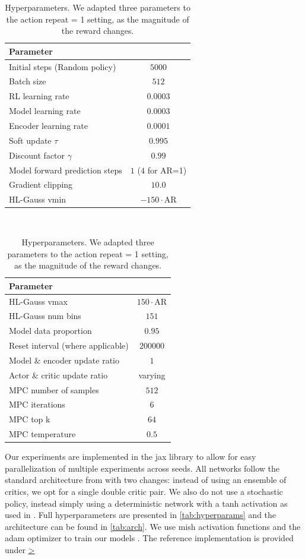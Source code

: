 \begin{table}[t]
    \begin{tabular}{l|c}
        Parameter & \\\hline 
        Initial steps (Random policy) & $5000$  \\
        Batch size & $512$ \\
        RL learning rate & $0.0003$ \\
        Model learning rate & $0.0003$ \\
        Encoder learning rate & $0.0001$ \\
        Soft update $\tau$  & $0.995$ \\
        Discount factor $\gamma$  & $0.99$\\
        Model forward prediction steps & $1$ ($4$ for AR=1) \\
        Gradient clipping &  $10.0$ \\
        HL-Gauss vmin& $-150 \cdot \mathrm{AR}$ \\
    \end{tabular}
~
    \begin{tabular}{l|c}
        Parameter & \\\hline 
        HL-Gauss vmax& $150 \cdot \mathrm{AR}$\\ 
        HL-Gauss num bins& $151$\\
        Model data proportion& $0.95$\\
        Reset interval (where applicable)& $200000$\\
        Model \& encoder update ratio & $1$ \\
        Actor \& critic update ratio & varying \\
        MPC number of samples & $512$ \\
        MPC iterations& $6$ \\
        MPC top k& $64$\\
        MPC temperature& $0.5$
    \end{tabular}
    \caption{Hyperparameters. We adapted three parameters to the action repeat = 1 setting, as the magnitude of the reward changes.}
    \label{tab:hyperparams}
\end{table}

Our experiments are implemented in the jax library to allow for easy parallelization of multiple experiments across seeds.
All networks follow the standard architecture from \textcite{hansen2024tdmpc} with two changes: instead of using an ensemble of critics, we opt for a single double critic pair.
We also do not use a stochastic policy, instead simply using a deterministic network with a tanh activation as used in \textcite{ddpg,fujimoto2018addressing}.
Full hyperparameters are presented in \autoref{tab:hyperparams} and the architecture can be found in \autoref{tab:arch}.
We use mish activation functions \parencite{misra2020mish} and the adam optimizer to train our models \parencite{kingma2015adam}.
The reference implementation is provided under \href{https://github.com/adaptive-agents-lab/MAD-TD}>

